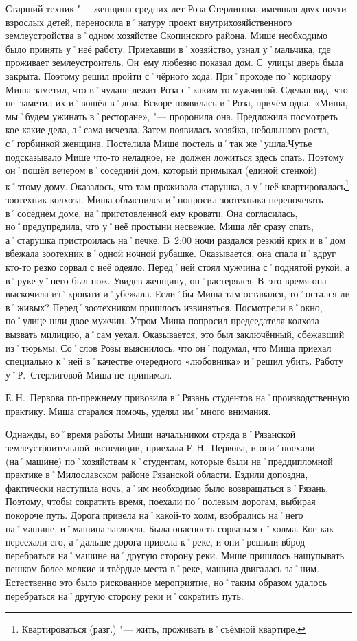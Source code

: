Старший техник "--- женщина средних лет Роза Стерлигова, имевшая двух почти взрослых детей, переносила в˚натуру проект внутрихозяйственного землеустройства в˚одном хозяйстве Скопинского района. Мише необходимо было принять у˚неё работу. Приехавши в˚хозяйство, узнал у˚мальчика, где проживает землеустроитель. Он~ему любезно показал дом. С~улицы дверь была закрыта. Поэтому решил пройти с˚чёрного хода. При˚проходе по˚коридору Миша заметил, что в˚чулане лежит Роза с˚каким-то мужчиной. Сделал вид, что не~заметил их и˚вошёл в˚дом. Вскоре появилась и˚Роза, причём одна. «Миша, мы˚будем ужинать в˚ресторане»,  "--- проронила она. Предложила посмотреть кое-какие дела, а˚сама исчезла. Затем появилась хозяйка, небольшого роста, с˚горбинкой женщина. Постелила Мише постель и˚так же˚ушла.Чутье подсказывало Мише что-то неладное, не~должен ложиться здесь спать. Поэтому он˚пошёл вечером в˚соседний дом, который примыкал (единой стенкой) к˚этому дому. Оказалось, что там проживала старушка, а у˚неё квартировалась\footnote{Квартироваться (разг.) "--- жить, проживать в˚съёмной квартире.} зоотехник колхоза. Миша объяснился и˚попросил зоотехника переночевать в˚соседнем доме, на˚приготовленной ему кровати. Она согласилась, но˚предупредила, что у˚неё простыни несвежие. Миша лёг сразу спать, а˚старушка пристроилась на˚печке. В~2:00 ночи раздался резкий крик и в˚дом вбежала зоотехник в˚одной ночной рубашке. Оказывается, она спала и˚вдруг кто-то резко сорвал с неё одеяло. Перед˚ней стоял мужчина с˚поднятой рукой, а в˚руке у˚него был нож. Увидев женщину, он˚растерялся. В~это время она выскочила из˚кровати и˚убежала. Если˚бы Миша там оставался, то˚остался ли в˚живых? Перед˚зоотехником пришлось извиняться. Посмотрели в˚окно, по˚улице шли двое мужчин. Утром Миша попросил председателя колхоза вызвать милицию, а˚сам уехал. Оказывается, это был заключённый, сбежавший из˚тюрьмы. Со˚слов Розы выяснилось, что он˚подумал, что Миша приехал специально к˚ней в˚качестве очередного «любовника» и˚решил убить. Работу у˚Р.~Стерлиговой Миша не~принимал.

Е.\,Н.~Первова по-прежнему привозила в˚Рязань студентов на˚производственную практику. Миша старался помочь, уделял им˚много внимания.

Однажды, во˚время работы Миши начальником отряда в˚Рязанской землеустроительной экспедиции, приехала Е.\,Н.~Первова, и они˚поехали (на˚машине) по˚хозяйствам к˚студентам, которые были на˚преддипломной практике в˚Милославском районе Рязанской области. Ездили допоздна, фактически наступила ночь, а˚им необходимо было возвращаться в˚Рязань. Поэтому, чтобы сократить время, поехали по˚полевым дорогам, выбирая покороче путь. Дорога привела на˚какой-то холм, взобрались на˚него на˚машине, и˚машина заглохла. Была опасность сорваться с˚холма. Кое-как переехали его, а˚дальше дорога привела к˚реке, и они˚решили вброд перебраться на˚машине на˚другую сторону реки. Мише пришлось нащупывать пешком более мелкие и твёрдые места в˚реке, машина двигалась за˚ним. Естественно это было рискованное мероприятие, но˚таким образом удалось перебраться на˚другую сторону реки и˚сократить путь. 

